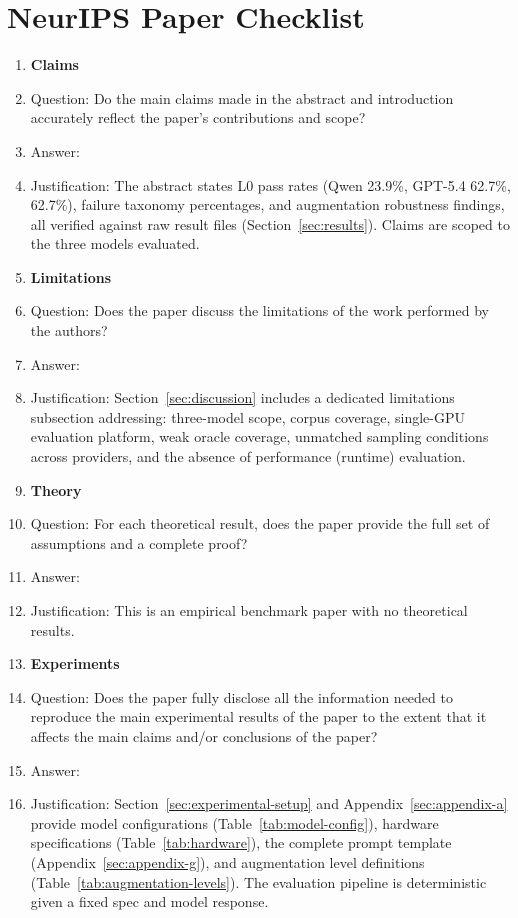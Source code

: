 \section*{NeurIPS Paper Checklist}
{
\begin{enumerate}

\item {\bf Claims}
    \item[] Question: Do the main claims made in the abstract and introduction accurately reflect the paper's contributions and scope?
    \item[] Answer: \answerYes{}
    \item[] Justification: The abstract states L0 pass rates (Qwen 23.9\%, GPT-5.4 62.7\%, \codex{} 62.7\%), failure taxonomy percentages, and augmentation robustness findings, all verified against raw result files (Section~\ref{sec:results}). Claims are scoped to the three models evaluated.

\item {\bf Limitations}
    \item[] Question: Does the paper discuss the limitations of the work performed by the authors?
    \item[] Answer: \answerYes{}
    \item[] Justification: Section~\ref{sec:discussion} includes a dedicated limitations subsection addressing: three-model scope,
   corpus coverage, single-GPU evaluation platform, weak oracle coverage, unmatched sampling conditions across providers, and the   
  absence of performance (runtime) evaluation.

\item {\bf Theory}
    \item[] Question: For each theoretical result, does the paper provide the full set of assumptions and a complete proof?
    \item[] Answer: \answerNA{}
    \item[] Justification: This is an empirical benchmark paper with no theoretical results.

\item {\bf Experiments}
    \item[] Question: Does the paper fully disclose all the information needed to reproduce the main experimental results of the paper to the extent that it affects the main claims and/or conclusions of the paper?
    \item[] Answer: \answerYes{}
    \item[] Justification: Section~\ref{sec:experimental-setup} and Appendix~\ref{sec:appendix-a} provide model configurations (Table~\ref{tab:model-config}), hardware specifications (Table~\ref{tab:hardware}), the complete prompt template (Appendix~\ref{sec:appendix-g}), and augmentation level definitions (Table~\ref{tab:augmentation-levels}). The evaluation pipeline is deterministic given a fixed spec and model response.


\end{enumerate}}

